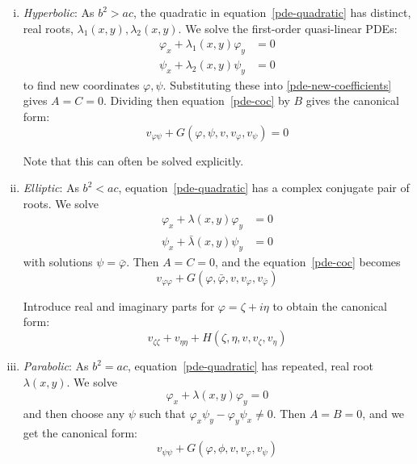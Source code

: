 \documentclass[10pt,fleqn]{article}
\theoremstyle{definition} \newtheorem{defn}{Definition}[section]
\theoremstyle{plain}      \newtheorem{thm}[defn]{Theorem}
\theoremstyle{plain}      \newtheorem{lem}[defn]{Lemma}
\theoremstyle{definition} \newtheorem{prop}[defn]{Proposition}
\theoremstyle{definition} \newtheorem{cor}[defn]{Corollary}
\theoremstyle{definition} \newtheorem{ex}[defn]{Example}
\theoremstyle{definition} \newtheorem{rem}[defn]{Remark}
\begin{document}
\begin{enumerate}[(i)]
    \item \emph{Hyperbolic}:
    As $b^2>ac$, the quadratic in equation~\ref{pde-quadratic} has distinct, real roots, $\lambda_1(x,y),\lambda_2(x,y)$.
    We solve the first-order quasi-linear PDEs:
    \[
        \begin{array}{rcl}
            \varphi_x+\lambda_1(x,y)\varphi_y
            &=0\\
            \psi_x+\lambda_2(x,y)\psi_y
            &=0
        \end{array}
    \]
    to find new coordinates $\varphi,\psi$.
    Substituting these into \ref{pde-new-coefficients} gives $A=C=0$.
    Dividing then equation~\ref{pde-coc} by $B$ gives the canonical form:
    \begin{equation}
        v_{\varphi\psi}+G(\varphi,\psi,v,v_{\varphi},v_{\psi})=0
    \end{equation}

    Note that this can often be solved explicitly.
    \item \emph{Elliptic}:
    As $b^2<ac$, equation~\ref{pde-quadratic} has a complex conjugate pair of roots.
    We solve
    \[
        \begin{array}{rcl}
            \varphi_x+\lambda(x,y)\varphi_y
            &=0\\
            \psi_x+\bar{\lambda}(x,y)\psi_y
            &=0
        \end{array}
    \]
    with solutions $\psi=\bar{\varphi}$.
    Then $A=C=0$, and the equation~\ref{pde-coc} becomes
    \[
        v_{\varphi\varphi}+G(\varphi,\bar{\varphi},v,v_{\varphi},v_{\bar{\varphi}})
    \]

    Introduce real and imaginary parts for $\varphi=\zeta+i\eta$ to obtain the canonical form:
    \begin{equation}
        v_{\zeta\zeta}+v_{\eta\eta}+H(\zeta,\eta,v,v_{\zeta},v_{\eta})
    \end{equation}
    \item \emph{Parabolic}:
    As $b^2=ac$, equation~\ref{pde-quadratic} has repeated, real root $\lambda(x,y)$.
    We solve
    \[
        \varphi_x+\lambda(x,y)\varphi_y=0
    \]
    and then choose any $\psi$ such that $\varphi_x\psi_y-\varphi_y\psi_x\neq0$.
    Then $A=B=0$, and we get the canonical form:
    \begin{equation}
        v_{\psi\psi}+G(\varphi,\phi,v,v_{\varphi},v_{\psi})
    \end{equation}
\end{enumerate}
\end{document}
